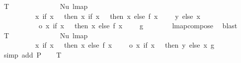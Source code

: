 \begin{isabellebody}
\ T{}{\isacharcolon}{\kern0pt}\ {\isachardoublequoteopen}{\isachardot}{\kern0pt}{\isachardot}{\kern0pt}{\isachardot}{\kern0pt}\ {\isacharequal}{\kern0pt}\isanewline
\ \ \ \ \ \ \ \ \ \ \ \ Nu\ {\isacharparenleft}{\kern0pt}lmap\isanewline
\ \ \ \ \ \ \ \ \ \ {\isacharparenleft}{\kern0pt}{\isacharparenleft}{\kern0pt}{\isasymlambda}x{\isachardot}{\kern0pt}\ if\ x\ {\isacharequal}{\kern0pt}\ {}\ then\ {\isacharparenleft}{\kern0pt}{\isasymlambda}x{\isachardot}{\kern0pt}\ if\ x\ {\isacharequal}{\kern0pt}\ {}\ then\ x\ else\ f\ {\isacharparenleft}{\kern0pt}x\ {\isacharminus}{\kern0pt}\ {}{\isacharparenright}{\kern0pt}\ {\isacharplus}{\kern0pt}\ {}{\isacharparenright}{\kern0pt}\ y\ else\ x{\isacharparenright}{\kern0pt}\isanewline
\ \ \ \ \ \ \ \ \ \ \ o\ {\isacharparenleft}{\kern0pt}{\isasymlambda}x{\isachardot}{\kern0pt}\ if\ x\ {\isacharequal}{\kern0pt}\ {}\ then\ x\ else\ f\ {\isacharparenleft}{\kern0pt}x\ {\isacharminus}{\kern0pt}\ {}{\isacharparenright}{\kern0pt}\ {\isacharplus}{\kern0pt}\ {}{\isacharparenright}{\kern0pt}{\isacharparenright}{\kern0pt}\ g{\isacharparenright}{\kern0pt}{\isachardoublequoteclose}\isanewline
\ \ \ \ \ \ \isamarkupfalse%
\ lmap{\isacharunderscore}{\kern0pt}compose\ \isamarkupfalse%
\ blast\isanewline
\ \ \isamarkupfalse%
\ T{}{\isacharcolon}{\kern0pt}\ {\isachardoublequoteopen}{\isachardot}{\kern0pt}{\isachardot}{\kern0pt}{\isachardot}{\kern0pt}\ {\isacharequal}{\kern0pt}\isanewline
\ \ \ \ \ \ \ \ \ \ \ \ Nu\ {\isacharparenleft}{\kern0pt}lmap\isanewline
\ \ \ \ \ \ \ \ \ \ {\isacharparenleft}{\kern0pt}{\isacharparenleft}{\kern0pt}{\isasymlambda}x{\isachardot}{\kern0pt}\ if\ x\ {\isacharequal}{\kern0pt}\ {}\ then\ x\ else\ f\ {\isacharparenleft}{\kern0pt}x\ {\isacharminus}{\kern0pt}\ {}{\isacharparenright}{\kern0pt}\ {\isacharplus}{\kern0pt}\ {}{\isacharparenright}{\kern0pt}\ o\ {\isacharparenleft}{\kern0pt}{\isasymlambda}x{\isachardot}{\kern0pt}\ if\ x\ {\isacharequal}{\kern0pt}\ {}\ then\ y\ else\ x{\isacharparenright}{\kern0pt}{\isacharparenright}{\kern0pt}\ g{\isacharparenright}{\kern0pt}{\isachardoublequoteclose}\isanewline
\ \ \ \ \isamarkupfalse%
\ {\isacharparenleft}{\kern0pt}simp\ add{\isacharcolon}{\kern0pt}\ P{}{\isacharparenright}{\kern0pt}\isanewline
\ \ \isamarkupfalse%
\ T{}{\isacharcolon}{\kern0pt}\ {\isachardoublequoteopen}{\isachardot}{\kern0pt}{\isachardot}{\kern0pt}{\isachardot}{\kern0pt}\ {\isacharequal}{\kern0pt}\isanewline

\end{isabellebody}
